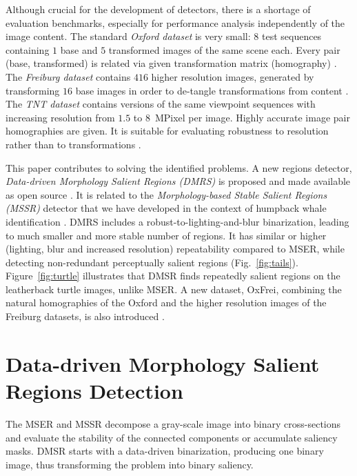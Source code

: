 \documentclass{article}
\begin{document}
Although crucial for the development of detectors, there is a shortage of evaluation benchmarks, especially for performance analysis independently of the image content. The standard {\em Oxford dataset} is very small: $8$ test sequences containing $1$ base and $5$ transformed images of the same scene each. Every pair (base, transformed) is related via given transformation matrix (homography) \cite{Mikolajczyk:2005}.  The {\em Freiburg dataset} contains $416$ higher resolution images, generated by transforming $16$ base images in order to de-tangle transformations from content \cite{FischerDB14}.  
The {\em TNT dataset} contains versions of the same viewpoint sequences with increasing resolution from $1.5$ to $8$~MPixel per image. Highly accurate image pair homographies are given. It is suitable for evaluating robustness to resolution rather than to transformations \cite{CorRos2013}. 

This paper contributes to solving the identified problems. A new regions detector, {\em Data-driven Morphology Salient Regions (DMRS)} is proposed and made available as open source \cite{Rang:software}. It is related to the {\em Morphology-based Stable Salient Regions (MSSR)} detector that we have developed in the context of humpback whale identification \cite{RangMSSR06, RangHumpb06}. DMRS includes a robust-to-lighting-and-blur binarization, leading to much smaller and more stable number of regions. It has similar or higher (lighting, blur and increased resolution) repeatability compared to MSER, while detecting non-redundant perceptually salient regions (Fig.~\ref{fig:tails}). Figure~\ref{fig:turtle} illustrates that DMSR finds repeatedly salient regions on the leatherback turtle images, unlike MSER. A new dataset, OxFrei, combining the natural homographies of the Oxford and the higher resolution images of the Freiburg datasets, is also introduced \cite{Rang:dataset}.

\section{Data-driven Morphology Salient Regions Detection}
\label{sec:DMSR}

The MSER and MSSR decompose a gray-scale image into binary cross-sections and evaluate the stability of the connected components or accumulate saliency masks. DMSR starts with a data-driven binarization, producing one binary image, thus transforming the problem into binary saliency.
\end{document}
